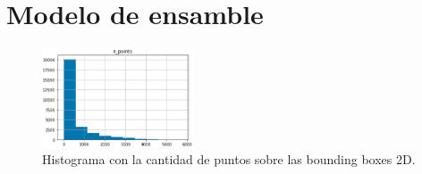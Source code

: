 \section{Modelo de ensamble}
\label{sec:Modelo de ensamble}

\begin{figure}[H]
    \centering
    \includegraphics[width=0.4\textwidth]{Book/figures/6_approx_distancia/n_points_hist.png}
    \caption{Histograma con la cantidad de puntos sobre las bounding boxes 2D.}
    \label{fig:Histograma con la cantidad de puntos sobre las bounding boxes 2D.}
\end{figure}

